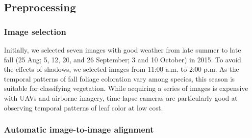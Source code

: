 \documentclass{article}
\begin{document}
\hypertarget{preprocessing}{%
\subsection{Preprocessing}\label{preprocessing}}

\hypertarget{image-selection}{%
\subsubsection{Image selection}\label{image-selection}}

Initially, we selected seven images with good weather from late summer to late fall (25 Aug; 5, 12, 20, and 26 September; 3 and 10 October) in 2015. To avoid the effects of shadows, we selected images from 11:00 a.m. to 2:00 p.m. As the temporal patterns of fall foliage coloration vary among species, this season is suitable for classifying vegetation. While acquiring a series of images is expensive with UAVs and airborne imagery, time-lapse cameras are particularly good at observing temporal patterns of leaf color at low cost.

\hypertarget{automatic-image-to-image-alignment}{%
\subsubsection{Automatic image-to-image alignment}\label{automatic-image-to-image-alignment}}
\end{document}
